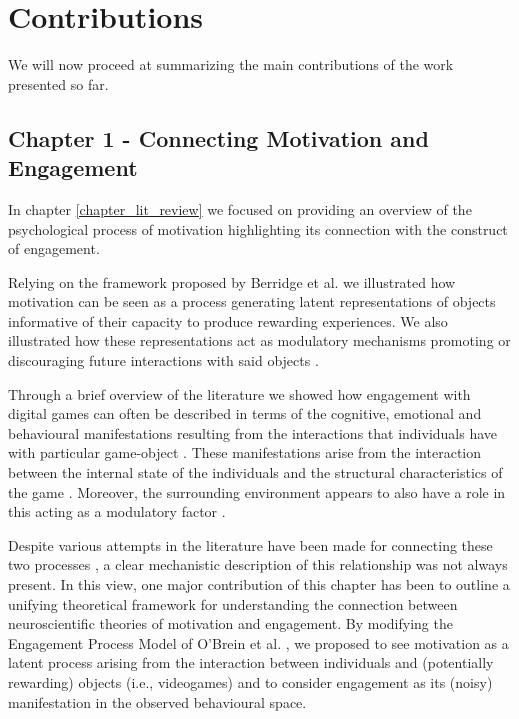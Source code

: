 \section{Contributions}

We will now proceed at summarizing the main contributions of the work presented so far. 

\subsection{Chapter 1 - Connecting Motivation and Engagement}
\label{discussion_chapter_one}
In chapter \ref{chapter_lit_review} we focused on providing an overview of the psychological process of motivation highlighting its connection with the construct of engagement.

Relying on the framework proposed by Berridge et al. \cite{berridge1998role} we illustrated how motivation can be seen as a process generating latent representations of objects informative of their capacity to produce rewarding experiences. We also illustrated how these representations act as modulatory mechanisms promoting or discouraging future interactions with said objects \cite{berridge2004motivation}.

Through a brief overview of the literature we showed how engagement with digital games can often be described in terms of the cognitive, emotional and behavioural manifestations resulting from the interactions that individuals have with particular game-object \cite{boyle2012engagement, jennett2008measuring, przybylski2010motivational}. These manifestations arise from the interaction between the internal state of the individuals and the structural characteristics of the game \cite{lucas2004sex,o2008user,jennett2008measuring,boyle2012engagement,connolly2012systematic,csikszentmihalyi2014toward}. Moreover, the surrounding environment appears to also have a role in this acting as a modulatory factor \cite{o2008user, bialas2014cultural, vihanga2019weekly, zendle2022transnational}.

Despite various attempts in the literature have been made for connecting these two processes \cite{przybylski2010motivational, nacke2011brainhex, deterding2022mastering}, a clear mechanistic description of this relationship was not always present. In this view, one major contribution of this chapter has been to outline a unifying theoretical framework for understanding the connection between neuroscientific theories of motivation and engagement. By modifying the Engagement Process Model of O'Brein et al. \cite{o2008usero}, we proposed to see motivation as a latent process arising from the interaction between individuals and (potentially rewarding) objects (i.e., videogames) and to consider engagement as its (noisy) manifestation in the observed behavioural space. 


